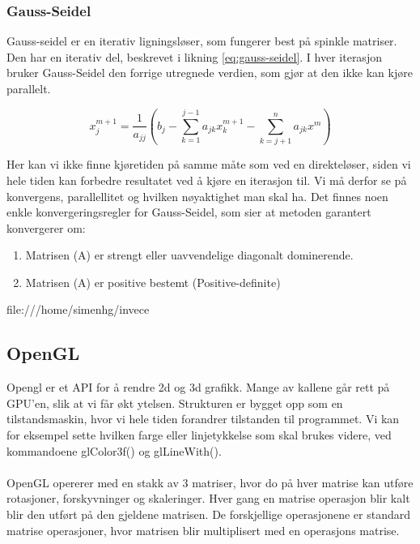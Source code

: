 \documentclass[10pt,a4paper, norsk]{article}
\begin{document}
\subsubsection*{Gauss-Seidel}
Gauss-seidel er en iterativ ligningsløser, som fungerer best på spinkle matriser. Den har en iterativ del, beskrevet i likning \ref{eq:gauss-seidel}. I hver iterasjon bruker Gauss-Seidel  den forrige utregnede verdien, som gjør at den ikke kan kjøre parallelt. 
 
 \begin{equation} \label{seideliterater}
   x_j^{m+1} = \frac{1}{a_{jj}}  (b_j - \sum_{k=1}^{j-1} a_{jk} x_k^{m+1} - \sum_{k=j+1}^n a_{jk}x^m)
 \end{equation}

Her kan vi ikke finne kjøretiden på samme måte som ved en direkteløser, siden vi hele tiden kan forbedre resultatet ved å kjøre en iterasjon til. Vi må derfor se på konvergens, parallellitet og hvilken nøyaktighet man skal ha. Det finnes noen enkle konvergeringsregler for Gauss-Seidel, som sier at metoden garantert konvergerer om:
\begin{enumerate}
\item Matrisen (A) er strengt eller uavvendelige diagonalt dominerende.
\item Matrisen (A) er positive bestemt (Positive-definite)
\end{enumerate}file:///home/simenhg/invece%



\subsection*{OpenGL}
Opengl er et API for å rendre 2d og 3d grafikk. Mange av kallene går rett på GPU'en, slik at vi får økt ytelsen. Strukturen er bygget opp som en tilstandsmaskin, hvor vi hele tiden forandrer tilstanden til programmet. Vi kan for eksempel sette hvilken farge eller linjetykkelse som skal brukes videre, ved kommandoene glColor3f() og glLineWith().

\paragraph*{}
OpenGL opererer med en stakk av 3 matriser, hvor do på hver matrise kan utføre rotasjoner, forskyvninger og skaleringer. Hver gang en matrise operasjon blir kalt blir den utført på den gjeldene matrisen. De forskjellige operasjonene er standard matrise operasjoner, hvor matrisen blir multiplisert med en operasjons matrise.
\end{document}
